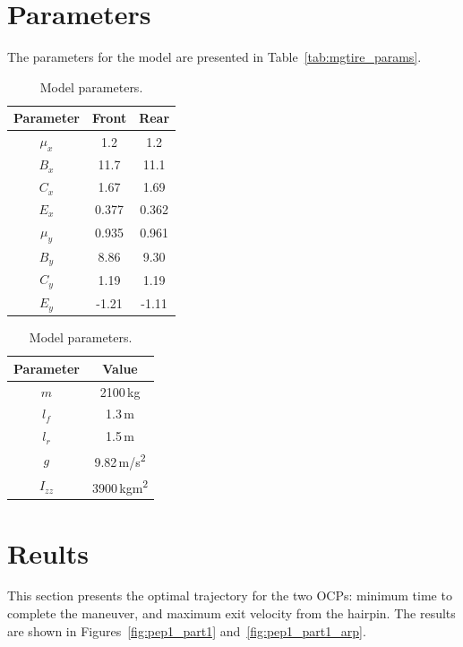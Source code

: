 \section{Parameters}\label{sec:STparams}
The parameters for the model are presented in Table~\ref{tab:mgtire_params}.
\begin{table}[h!]
    \begin{subtable}{0.49\textwidth}
        \begin{tabular}{c|c|c}
            Parameter & Front & Rear \\
            \hline
            $\mu_x$ & 1.2 & 1.2\\
            $B_x$ & 11.7 & 11.1\\
            $C_x$ & 1.67 & 1.69\\
            $E_x$ & 0.377 & 0.362\\
            $\mu_y$ & 0.935 & 0.961\\
            $B_y$ & 8.86 & 9.30\\
            $C_y$ & 1.19 & 1.19\\
            $E_y$ & -1.21 & -1.11\\
        \end{tabular}
        \caption{Pacejka Magic Formula model parameters.}
        \label{tab:mgtire_params}
    \end{subtable}
    \hfill
    \begin{subtable}{0.49\textwidth}
        \begin{tabular}{c|c}
            Parameter & Value\\
            \hline
            $m$ & 2100\,kg\\
            $l_f$ & 1.3\,m\\
            $l_r$ & 1.5\,m\\
            $g$ & 9.82\,m/s\textsuperscript{2}\\
            $I_{zz}$ & 3900\,kgm\textsuperscript{2}\\
        \end{tabular}
        \caption{Vehicle model parameters.}
        \label{tab:veh_ST_params}
    \end{subtable}
    \caption{Model parameters.}
\end{table}

\section{Reults}
This section presents the optimal trajectory for the two OCPs: minimum time to complete the maneuver, and maximum exit velocity from the hairpin. The results are shown in Figures~\ref{fig:pep1_part1} and~\ref{fig:pep1_part1_arp}.

